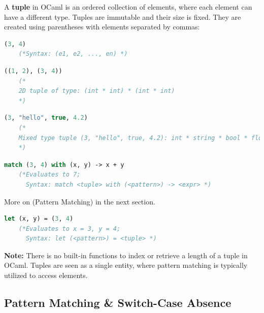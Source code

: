 \vfill

\newpage


\begin{Def}

    A \textbf{tuple} in OCaml is an ordered collection of elements, where each element can have a different type. Tuples are immutable and their size is fixed. They are created using parentheses with elements separated by commas:
    \begin{lstlisting}[language=OCaml, caption={Defining a Tuple}, numbers=none]
    (3, 4)
    (*Syntax: (e1, e2, ..., en) *)
    \end{lstlisting}

    \begin{lstlisting}[language=OCaml, caption={2D Tuple}, numbers=none]
    ((1, 2), (3, 4))
    (* 
    2D tuple of type: (int * int) * (int * int) 
    *)
    \end{lstlisting}

    \begin{lstlisting}[language=OCaml, caption={Mixed Type Tuple}, numbers=none]
    (3, "hello", true, 4.2)
    (*
    Mixed type tuple (3, "hello", true, 4.2): int * string * bool * float 
    *)
    \end{lstlisting}

    \begin{lstlisting}[language=OCaml, caption={Accessing Tuple via Pattern Matching}, numbers=none]
    match (3, 4) with (x, y) -> x + y
    (*Evaluates to 7; 
      Syntax: match <tuple> with (<pattern>) -> <expr> *)
    \end{lstlisting}
    \noindent
    More on  (Pattern Matching) in the next section.

    \begin{lstlisting}[language=OCaml, caption={Accessing Tuple via Decomposition}, numbers=none]
    let (x, y) = (3, 4)
    (*Evaluates to x = 3, y = 4; 
      Syntax: let (<pattern>) = <tuple> *)
    \end{lstlisting}

    \noindent
    \textbf{Note:} There is no built-in functions to index or retrieve a length of a tuple in OCaml. Tuples 
    are seen as a single entity, where pattern matching is typically utilized to access elements.
\end{Def}

\newpage 
\subsection{Pattern Matching \& Switch-Case Absence}

